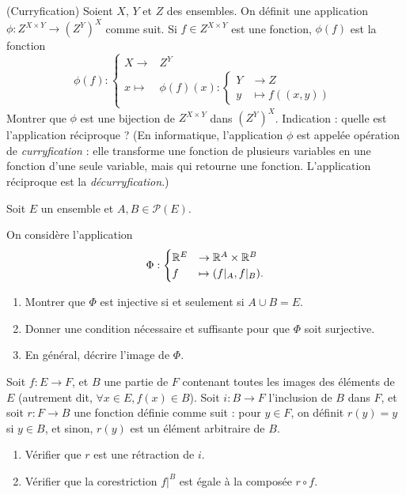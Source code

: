 \begin{exercice}(Curryfication)
Soient $X$, $Y$ et $Z$ des ensembles. On définit une application $\phi : Z^{X\times Y} \to \left(Z^Y\right)^X$ comme suit. Si $f\in Z^{X\times Y}$ est une fonction, $\phi(f)$ est la fonction 
\[ \phi(f) : \begin{cases}
X \to &Z^Y\\
x\mapsto& \phi(f)(x):\begin{cases}Y&\to Z\\y&\mapsto f\left( (x,y) \right)\end{cases}
\end{cases}
\]
Montrer que $\phi$ est une bijection de $Z^{X\times Y} $ dans $\left(Z^Y\right)^X$. Indication : quelle est l'application réciproque ?
(En informatique, l'application $\phi$ est appelée opération de \emph{curryfication} : elle transforme une fonction de plusieurs variables en une fonction d'une seule variable, mais qui retourne une fonction. L'application réciproque est la \emph{décurryfication}.)
\end{exercice}

\begin{exercice}
Soit $E$ un ensemble et $A, B \in \mathcal P(E)$.

On considère l'application
\[ \Phi : \begin{cases}
\mathbb{R}^E &\to \mathbb{R}^A \times \mathbb{R}^B\\
f&\mapsto (f|_A, f|_B).
\end{cases}\]
\begin{enumerate}
\item Montrer que $\Phi$ est injective si et seulement si $A \cup B = E$.
\item Donner une condition nécessaire et suffisante pour que $\Phi$ soit surjective.
\item En général, décrire l'image de $\Phi$.
\end{enumerate}
\end{exercice}

\begin{exercice}
Soit $f : E\to F$, et $B$ une partie de $F$ contenant toutes les images des éléments de $E$ (autrement dit, $\forall x\in E, f(x)\in B$).
Soit $i : B\to F$ l'inclusion de $B$ dans $F$, et soit $r : F\to B$ une fonction définie comme suit : pour $y\in F$, on définit $r(y)=y$ si $y\in B$, et sinon, $r(y)$ est un élément arbitraire de $B$. 
\begin{enumerate}
\item Vérifier que $r$ est une rétraction de $i$.
\item Vérifier que la corestriction $f|^{B}$ est égale à la composée $r\circ f$.
\end{enumerate}
\end{exercice}

